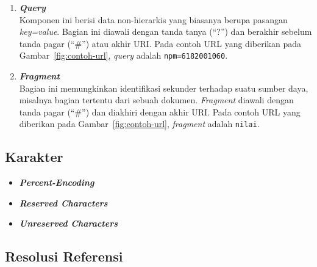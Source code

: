\begin{enumerate}
    \item \textbf{\textit{Query}}\\  
    Komponen ini berisi data non-hierarkis yang biasanya berupa pasangan \textit{key=value}. Bagian ini diawali dengan tanda tanya (``?'') dan berakhir sebelum tanda pagar (``\#'') atau akhir URI. Pada contoh URL yang diberikan pada Gambar~\ref{fig:contoh-url}, \textit{query} adalah \texttt{npm=6182001060}.
    
    \item \textbf{\textit{Fragment}}\\  
    Bagian ini memungkinkan identifikasi sekunder terhadap suatu sumber daya, misalnya bagian tertentu dari sebuah dokumen. \textit{Fragment} diawali dengan tanda pagar (``\#'') dan diakhiri dengan akhir URI. Pada contoh URL yang diberikan pada Gambar~\ref{fig:contoh-url}, \textit{fragment} adalah \texttt{nilai}.
\end{enumerate}



\subsection{Karakter}
\label{subsec:0202-karakter}

\begin{itemize}
    \item \textbf{\textit{Percent-Encoding}}
    
    \item \textbf{\textit{Reserved Characters}}
    
    \item \textbf{\textit{Unreserved Characters}}
    
\end{itemize}



\subsection{Resolusi Referensi}
\label{subsec:0202-resolusi-referensi}

